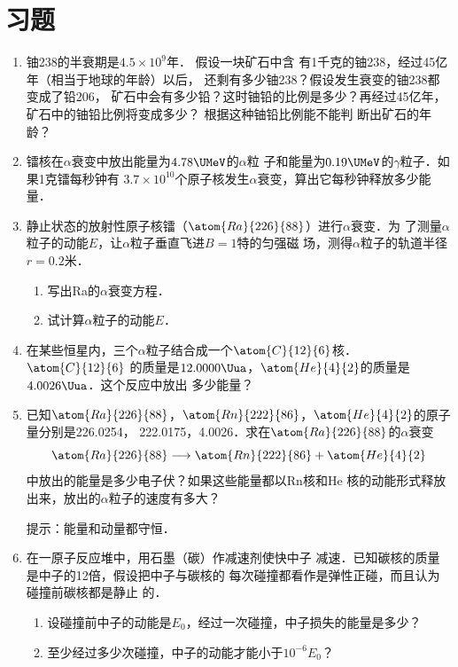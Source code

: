 \section*{习题}
\begin{enumerate}
    \item 铀238的半衰期是$4.5\times 10^9$年．
    假设一块矿石中含
有1千克的铀238，经过45亿年（相当于地球的年龄）以后，
还剩有多少铀238？假设发生衰变的铀238都变成了铅206，
矿石中会有多少铅？这时铀铅的比例是多少？再经过45亿年，
矿石中的铀铅比例将变成多少？ 根据这种铀铅比例能不能判
断出矿石的年龄？
\item 镭核在$\alpha$衰变中放出能量为$4.78 \UMeV$的$\alpha$粒
子和能量为$0.19 \UMeV$的$\gamma$粒子．如果1克镭每秒钟有
$3.7\times10^{10}$个原子核发生$\alpha$衰变，算出它每秒钟释放多少能量．
\item 静止状态的放射性原子核镭（$\atom{Ra}{226}{88}$）进行$\alpha$衰变．为
了测量$\alpha$粒子的动能$E$，让$\alpha$粒子垂直飞进$B=1$特的匀强磁
场，测得$\alpha$粒子的轨道半径$r=0.2$米．
\begin{enumerate}
    \item 写出Ra的$\alpha$衰变方程．
    \item 试计算$\alpha$粒子的动能$E$．
\end{enumerate}

\item 在某些恒星内，三个$\alpha$粒子结合成一个$\atom{C}{12}{6}$核．$\atom{C}{12}{6}$
的质量是$12.0000 \Uua$，$\atom{He}{4}{2}$的质量是$4.0026 \Uua$．这个反应中放出
多少能量？
\item 已知$\atom{Ra}{226}{88}$，$\atom{Rn}{222}{86}$，$\atom{He}{4}{2}$的原子量分别是226.0254，
222.0175，4.0026．求在$\atom{Ra}{226}{88}$的$\alpha$衰变
\[\atom{Ra}{226}{88}\longrightarrow \atom{Rn}{222}{86}+\atom{He}{4}{2}\]
中放出的能量是多少电子伏？如果这些能量都以Rn核和He
核的动能形式释放出来，放出的$\alpha$粒子的速度有多大？

提示：能量和动量都守恒．

\item 在一原子反应堆中，用石墨（碳）作减速剂使快中子
减速．已知碳核的质量是中子的12倍，假设把中子与碳核的
每次碰撞都看作是弹性正碰，而且认为碰撞前碳核都是静止
的．
\begin{enumerate}
    \item 设碰撞前中子的动能是$E_0$，经过一次碰撞，中子损失的能量是多少？
    \item 至少经过多少次碰撞，中子的动能才能小于$10^{-6}E_0$？
\end{enumerate}

\end{enumerate}


